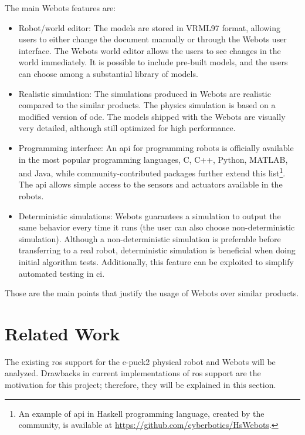 The main Webots features are:
\begin{itemize}
    \item Robot/world editor: The models are stored in VRML97 format, allowing users to either change the document manually or through the Webots user interface. 
    The Webots world editor allows the users to see changes in the world immediately.
    It is possible to include pre-built models, and the users can choose among a substantial library of models.
    \item Realistic simulation: The simulations produced in Webots are realistic compared to the similar products. 
    The physics simulation is based on a modified version of \ac{ode}.
    The models shipped with the Webots are visually very detailed, although still optimized for high performance.
    \item Programming interface: An \ac{api} for programming robots is officially available in the most popular programming languages, C, C++, Python, MATLAB, and Java, while community-contributed packages further extend this list\footnote{An example of \ac{api} in Haskell programming language, created by the community, is available at \url{https://github.com/cyberbotics/HsWebots}.}.
    The \ac{api} allows simple access to the sensors and actuators available in the robots.
    \item Deterministic simulations: Webots guarantees a simulation to output the same behavior every time it runs (the user can also choose non-deterministic simulation).
    Although a non-deterministic simulation is preferable before transferring to a real robot, deterministic simulation is beneficial when doing initial algorithm tests.
    Additionally, this feature can be exploited to simplify automated testing in \ac{ci}.
\end{itemize}

Those are the main points that justify the usage of Webots over similar products.

\section{Related Work}
The existing \ac{ros} support for the e-puck2 physical robot and Webots will be analyzed.
Drawbacks in current implementations of \ac{ros} support are the motivation for this project; therefore, they will be explained in this section.

